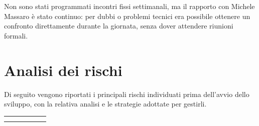 Non sono stati programmati incontri fissi settimanali, ma il rapporto con Michele Massaro è stato continuo: per dubbi o problemi tecnici era possibile ottenere un confronto direttamente durante la giornata, senza dover attendere riunioni formali.

\section{Analisi dei rischi}

Di seguito vengono riportati i principali rischi individuati prima dell'avvio dello sviluppo, con la relativa analisi e le strategie adottate per gestirli.
\begingroup
\setlength{\LTleft}{-20cm plus 1fill}
\setlength{\LTright}{-20cm plus 1fill}

\begin{longtable}{L{2.2cm}|L{1.5cm}|L{1.5cm}|L{2.5cm}|L{2.5cm}|L{2.5cm}}
 & 
 & 
 & 
 & 
 & 
 \\
\endfirsthead
{}
 & 
 & 
 & 
 & 
 & 
 \\
\endhead
\endfoot


\end{longtable}
